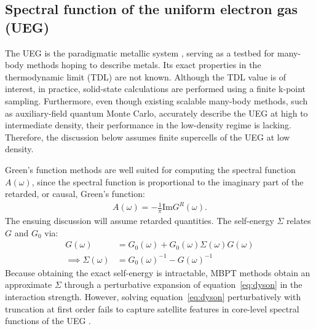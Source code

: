 \documentclass[letterpaper]{article}
\begin{document}
\subsection{Spectral function of the uniform electron gas (UEG)} The UEG is the paradigmatic metallic system \cite{Mahan2014-ad}, serving as a testbed for many-body methods hoping to describe metals. Its exact properties in the thermodynamic limit (TDL) are not known. Although the TDL value is of interest, in practice, solid-state calculations are performed using a finite k-point sampling. Furthermore, even though existing scalable many-body methods, such as auxiliary-field quantum Monte Carlo, accurately describe the UEG at high to intermediate density, their performance in the low-density regime is lacking\cite{Lee2021-hh}. Therefore, the discussion below assumes finite supercells of the UEG at low density. 

Green's function methods are well suited for computing the spectral function $A(\omega)$, since the spectral function
 is proportional to the imaginary part of the retarded, or causal, Green's function: \begin{align} A(\omega) = -\frac{1}{\pi} \mathrm{Im} G^R(\omega). \end{align}
The ensuing discussion will assume retarded quantities. The self-energy $\Sigma $ relates $G$ and $G_0$ via:
 \begin{align} G(\omega) &= G_0(\omega) + G_0(\omega) \Sigma(\omega) G(\omega) \label{eq:dyson}\\
\implies \Sigma (\omega ) &= G_0(\omega)^{-1} - G(\omega)^{-1} \label{eq:rearranged_dyson} \end{align}
Because obtaining the exact self-energy is intractable, MBPT methods obtain an approximate $\Sigma$ through a perturbative expansion of equation~\ref{eq:dyson} in the interaction strength. However, solving equation~\ref{eq:dyson} perturbatively with truncation at first order fails to capture satellite features in core-level spectral functions of the UEG \cite{Holm1997-by, Caruso2016-us,McClain2016-md}.
\end{document}
